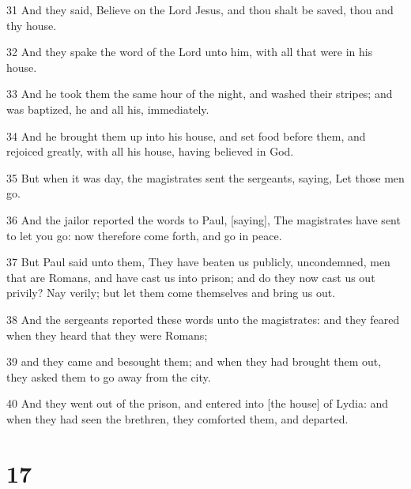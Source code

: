 \par 31 And they said, Believe on the Lord Jesus, and thou shalt be saved, thou and thy house.
\par 32 And they spake the word of the Lord unto him, with all that were in his house.
\par 33 And he took them the same hour of the night, and washed their stripes; and was baptized, he and all his, immediately.
\par 34 And he brought them up into his house, and set food before them, and rejoiced greatly, with all his house, having believed in God.
\par 35 But when it was day, the magistrates sent the sergeants, saying, Let those men go.
\par 36 And the jailor reported the words to Paul, [saying], The magistrates have sent to let you go: now therefore come forth, and go in peace.
\par 37 But Paul said unto them, They have beaten us publicly, uncondemned, men that are Romans, and have cast us into prison; and do they now cast us out privily? Nay verily; but let them come themselves and bring us out.
\par 38 And the sergeants reported these words unto the magistrates: and they feared when they heard that they were Romans;
\par 39 and they came and besought them; and when they had brought them out, they asked them to go away from the city.
\par 40 And they went out of the prison, and entered into [the house] of Lydia: and when they had seen the brethren, they comforted them, and departed.

\chapter{17}

